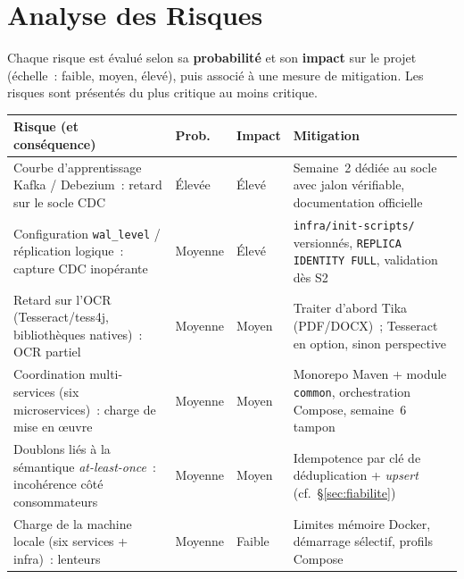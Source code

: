 \documentclass[12pt,a4paper,openany]{report}
\begin{document}
    \chapter{Analyse des Risques}

    Chaque risque est \'evalu\'e selon sa \textbf{probabilit\'e} et son \textbf{impact} sur le projet (\'echelle~: faible, moyen, \'elev\'e), puis associ\'e \`a une mesure de mitigation. Les risques sont pr\'esent\'es du plus critique au moins critique.

    \renewcommand{\arraystretch}{1.4}
    \begin{longtable}{>{\raggedright\arraybackslash}p{4.7cm} >{\centering\arraybackslash}p{1.7cm} >{\centering\arraybackslash}p{1.7cm} >{\raggedright\arraybackslash}p{4.3cm}}
      \toprule
      \textbf{Risque (et cons\'equence)} & \textbf{Prob.} & \textbf{Impact} & \textbf{Mitigation} \\
      \midrule
      \endhead
      \bottomrule
      \endfoot

      Courbe d'apprentissage Kafka / Debezium~: retard sur le socle CDC & \'Elev\'ee & \'Elev\'e & Semaine~2 d\'edi\'ee au socle avec jalon v\'erifiable, documentation officielle \\[4pt]
      Configuration \texttt{wal\_level} / r\'eplication logique~: capture CDC inop\'erante & Moyenne & \'Elev\'e & \texttt{infra/init-scripts/} versionn\'es, \texttt{REPLICA IDENTITY FULL}, validation d\`es S2 \\[4pt]
      Retard sur l'OCR (Tesseract/tess4j, biblioth\`eques natives)~: OCR partiel & Moyenne & Moyen & Traiter d'abord Tika (PDF/DOCX)~; Tesseract en option, sinon perspective \\[4pt]
      Coordination multi-services (six microservices)~: charge de mise en \oe uvre & Moyenne & Moyen & Monorepo Maven + module \texttt{common}, orchestration Compose, semaine~6 tampon \\[4pt]
      Doublons li\'es \`a la s\'emantique \emph{at-least-once}~: incoh\'erence c\^ot\'e consommateurs & Moyenne & Moyen & Idempotence par cl\'e de d\'eduplication + \emph{upsert} (cf.~\S\ref{sec:fiabilite}) \\[4pt]
      Charge de la machine locale (six services + infra)~: lenteurs & Moyenne & Faible & Limites m\'emoire Docker, d\'emarrage s\'electif, profils Compose \\
    \end{longtable}
    \renewcommand{\arraystretch}{1}
\end{document}
